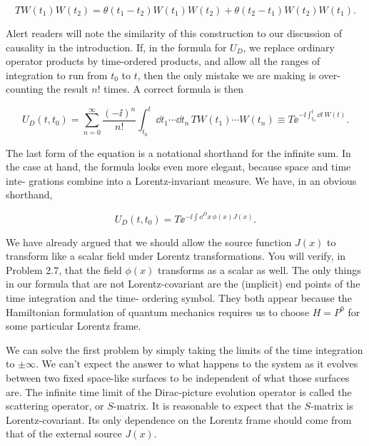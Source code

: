 \begin{equation}
TW(t_1)W(t_2)=\theta(t_1-t_2)W(t_1)W(t_2)+\theta(t_2-t_1)W(t_2)W(t_1).
\label{eq:2.17}
\end{equation}

Alert readers will note the similarity of this construction to our discussion of causality
in the introduction. If, in the formula for $U_D$, we replace ordinary operator products by
time-ordered products, and allow all the ranges of integration to run from $t_0$ to $t$, then
the only mistake we are making is over-counting the result $n!$ times. A correct formula
is then

\begin{equation}
U_D(t,t_0)=\sum_{n=0}^{\infty}\frac{(-\ii)^n}{n!}\int_{t_0}^{t}\dd t_1\cdots\dd t_n\,TW(t_1)\cdots W(t_n)
\equiv T\ee^{-\ii\int_{t_0}^{t}\dd t\,W(t)}.
\label{eq:2.18}
\end{equation}

The last form of the equation is a notational shorthand for the infinite sum.
In the case at hand, the formula looks even more elegant, because space and time inte-
grations combine into a Lorentz-invariant measure. We have, in an obvious shorthand,

\begin{equation}
U_D(t,t_0)=T\ee^{-\ii\int\dd^D x\,\phi(x)J(x)}.
\label{eq:2.19}
\end{equation}

We have already argued that we should allow the source function $J(x)$ to transform
like a scalar field under Lorentz transformations. You will verify, in Problem 2.7, that
the field $\phi(x)$ transforms as a scalar as well. The only things in our formula that are not
Lorentz-covariant are the (implicit) end points of the time integration and the time-
ordering symbol. They both appear because the Hamiltonian formulation of quantum
mechanics requires us to choose $H=P^0$ for some particular Lorentz frame.

We can solve the first problem by simply taking the limits of the time integration to
$\pm\infty$. We can't expect the answer to what happens to the system as it evolves between
two fixed space-like surfaces to be independent of what those surfaces are. The infinite
time limit of the Dirac-picture evolution operator is called the scattering operator, or
$S$-matrix. It is reasonable to expect that the $S$-matrix is Lorentz-covariant. Its only
dependence on the Lorentz frame should come from that of the external source $J(x)$.

